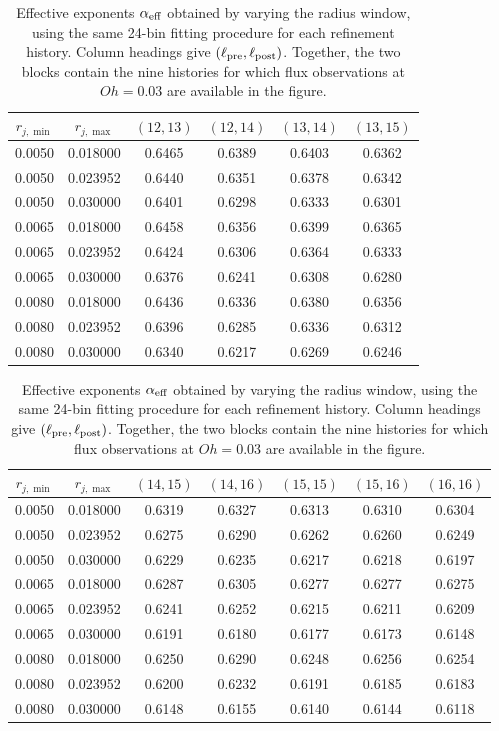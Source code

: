 \documentclass[10pt]{article}
\begin{document}
\begin{table}[ht]
\centering
\small
\begin{tabular}{cccccc}
\toprule
$r_{j,\min}$ & $r_{j,\max}$ & $(12,13)$ & $(12,14)$ & $(13,14)$ & $(13,15)$\\
\midrule
0.0050 & 0.018000 & 0.6465 & 0.6389 & 0.6403 & 0.6362\\
0.0050 & 0.023952 & 0.6440 & 0.6351 & 0.6378 & 0.6342\\
0.0050 & 0.030000 & 0.6401 & 0.6298 & 0.6333 & 0.6301\\
0.0065 & 0.018000 & 0.6458 & 0.6356 & 0.6399 & 0.6365\\
0.0065 & 0.023952 & 0.6424 & 0.6306 & 0.6364 & 0.6333\\
0.0065 & 0.030000 & 0.6376 & 0.6241 & 0.6308 & 0.6280\\
0.0080 & 0.018000 & 0.6436 & 0.6336 & 0.6380 & 0.6356\\
0.0080 & 0.023952 & 0.6396 & 0.6285 & 0.6336 & 0.6312\\
0.0080 & 0.030000 & 0.6340 & 0.6217 & 0.6269 & 0.6246\\
\bottomrule
\end{tabular}
\par
\medskip
\begin{tabular}{ccccccc}
\toprule
$r_{j,\min}$ & $r_{j,\max}$ & $(14,15)$ & $(14,16)$ & $(15,15)$ & $(15,16)$ & $(16,16)$\\
\midrule
0.0050 & 0.018000 & 0.6319 & 0.6327 & 0.6313 & 0.6310 & 0.6304\\
0.0050 & 0.023952 & 0.6275 & 0.6290 & 0.6262 & 0.6260 & 0.6249\\
0.0050 & 0.030000 & 0.6229 & 0.6235 & 0.6217 & 0.6218 & 0.6197\\
0.0065 & 0.018000 & 0.6287 & 0.6305 & 0.6277 & 0.6277 & 0.6275\\
0.0065 & 0.023952 & 0.6241 & 0.6252 & 0.6215 & 0.6211 & 0.6209\\
0.0065 & 0.030000 & 0.6191 & 0.6180 & 0.6177 & 0.6173 & 0.6148\\
0.0080 & 0.018000 & 0.6250 & 0.6290 & 0.6248 & 0.6256 & 0.6254\\
0.0080 & 0.023952 & 0.6200 & 0.6232 & 0.6191 & 0.6185 & 0.6183\\
0.0080 & 0.030000 & 0.6148 & 0.6155 & 0.6140 & 0.6144 & 0.6118\\
\bottomrule
\end{tabular}
\caption{Effective exponents $\alpha_{\rm eff}$ obtained by varying the radius window, using the same 24-bin fitting procedure for each refinement history. Column headings give $(\ell_{\rm pre},\ell_{\rm post})$. Together, the two blocks contain the nine histories for which flux observations at $Oh=0.03$ are available in the figure.}
\label{tab:windows}
\end{table}
\end{document}
